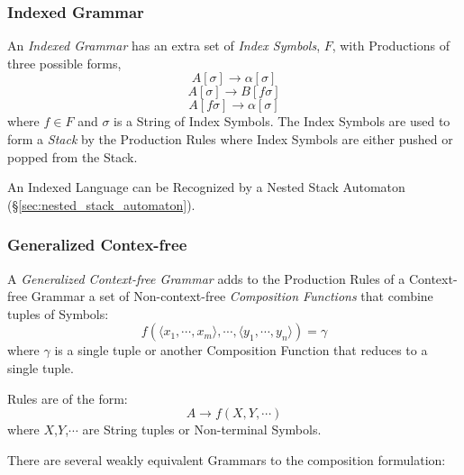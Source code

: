 \subsubsection{Indexed Grammar}\label{subsubsection:indexed_grammar}

An \emph{Indexed Grammar} has an extra set of \emph{Index Symbols},
$F$, with Productions of three possible forms,
\[
  A[\sigma] \rightarrow \alpha[\sigma]
\]\[
  A[\sigma] \rightarrow B[f\sigma]
\]\[
  A[f\sigma] \rightarrow \alpha[\sigma]
\]
where $f \in F$ and $\sigma$ is a String of Index Symbols. The Index
Symbols are used to form a \emph{Stack} by the Production Rules where
Index Symbols are either pushed or popped from the Stack.

An Indexed Language can be Recognized by a Nested Stack Automaton
(\S\ref{sec:nested_stack_automaton}).\cite{aho69}



\subsubsection{Generalized Contex-free}
\label{sec:generalized_context_free}

A \emph{Generalized Context-free Grammar} adds to the Production Rules
of a Context-free Grammar a set of Non-context-free \emph{Composition
  Functions} that combine tuples of Symbols:
\[
  f(\langle x_1,\cdots,x_m\rangle,\cdots,\langle
  y_1,\cdots,y_n\rangle)=\gamma
\]
where $\gamma$ is a single tuple or another Composition Function that
reduces to a single tuple.

Rules are of the form:
\[
  A \rightarrow f(X,Y,\cdots)
\]
where $X$,$Y$,$\cdots$ are String tuples or Non-terminal Symbols.

There are several weakly equivalent Grammars to the composition
formulation:

